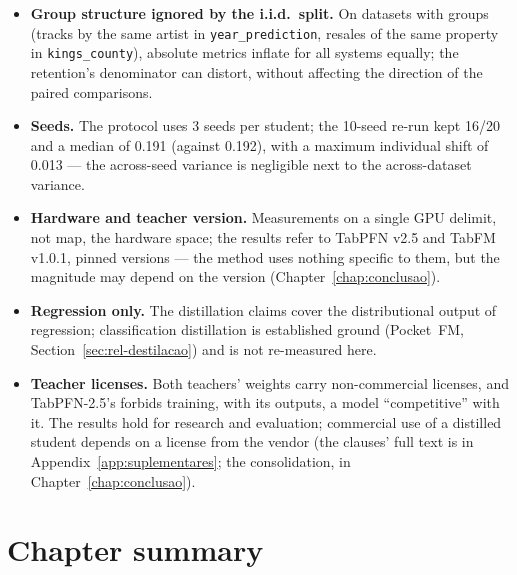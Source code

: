 \begin{itemize}
    with its sequential correction; E1; E3), all three stand
    (adjusted $p \approx 0.019$; $0.0026$; $0.0006$). The
    supplementary instruments, already borderline on their own
    (one-sided Wilcoxon 0.045; Fisher 0.043), do not stand; and in a
    family that included them, the headline's adjusted $p$ would be
    0.057.
  \item \textbf{Group structure ignored by the i.i.d.\ split.} On
    datasets with groups (tracks by the same artist in
    \texttt{year\_\allowbreak prediction}, resales of the same
    property in \texttt{kings\_county}), absolute metrics inflate
    for all systems equally; the retention's denominator can
    distort, without affecting the direction of the paired
    comparisons.
  \item \textbf{Seeds.} The protocol uses 3 seeds per student; the
    10-seed re-run kept 16/20 and a median of 0.191 (against
    0.192), with a maximum individual shift of 0.013 --- the
    across-seed variance is negligible next to the across-dataset
    variance.
  \item \textbf{Hardware and teacher version.} Measurements on a
    single GPU delimit, not map, the hardware space; the results
    refer to TabPFN v2.5 and TabFM v1.0.1, pinned versions --- the
    method uses nothing specific to them, but the magnitude may
    depend on the version (Chapter~\ref{chap:conclusao}).
  \item \textbf{Regression only.} The distillation claims cover the
    distributional output of regression; classification distillation
    is established ground (Pocket~FM,
    Section~\ref{sec:rel-destilacao}) and is not re-measured here.
  \item \textbf{Teacher licenses.} Both teachers' weights carry
    non-commercial licenses, and TabPFN-2.5's forbids training,
    with its outputs, a model ``competitive'' with it. The results
    hold for research and evaluation; commercial use of a distilled
    student depends on a license from the vendor (the clauses' full
    text is in Appendix~\ref{app:suplementares}; the consolidation,
    in Chapter~\ref{chap:conclusao}).
\end{itemize}

\section{Chapter summary}
\label{sec:destil-sintese}

